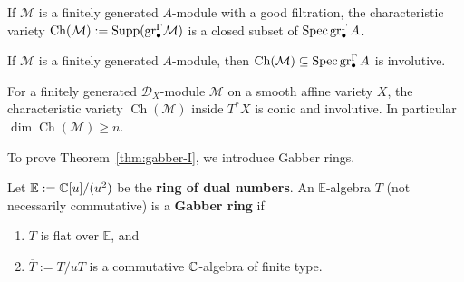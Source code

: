 If $\mathcal M$ is a finitely generated $A$-module with a good filtration, the characteristic
variety $\operatorname{Ch}(\mathcal M):=\operatorname{Supp}(\operatorname{gr}^{\Gamma}_\bullet\!\mathcal M)$ is a closed subset of
$\operatorname{Spec}\operatorname{gr}^{\Gamma}_\bullet A$.

\begin{theorem}\label{thm:gabber-I}
	If $\mathcal M$ is a finitely generated $A$-module, then $\operatorname{Ch}(\mathcal M)\subseteq\operatorname{Spec}\operatorname{gr}^{\Gamma}_\bullet A$ is involutive.
\end{theorem}

\begin{corollary}
	For a finitely generated $\mathcal{D}_X$-module $\mathcal{M}$ on a smooth affine variety $X$, the characteristic variety $\operatorname{Ch}(\mathcal{M})$ inside $T^{\ast}X$ is conic and involutive. In particular $\dim \operatorname{Ch}(\mathcal{M}) \ge n$.
\end{corollary}

To prove Theorem~\ref{thm:gabber-I}, we introduce Gabber rings.

\begin{definition}
	Let $\mathbb E:=\mathbb{C}[u]/(u^2)$ be the \textbf{ring of dual numbers}. An $\mathbb E$-algebra $T$ (not
	necessarily commutative) is a \textbf{Gabber ring} if
	\begin{enumerate}
		\item $T$ is flat over $\mathbb E$, and
		\item $\overline T:=T/uT$ is a commutative $\mathbb{C}$-algebra of finite type.
	\end{enumerate}
\end{definition}

